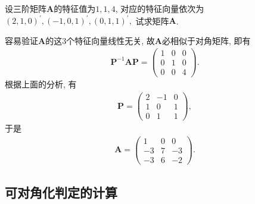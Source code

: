 \documentclass[../../main.tex]{subfiles}%
\begin{document}
\begin{example}
设三阶矩阵\(\boldsymbol{A}\)的特征值为\(1,1,4\), 对应的特征向量依次为
\((2,1,0)^{\prime},(-1,0,1)^{\prime},(0,1,1)^{\prime},\)
试求矩阵\(\boldsymbol{A}\).
\end{example}
\begin{solution}
容易验证\(\boldsymbol{A}\)的这\(3\)个特征向量线性无关, 故\(\boldsymbol{A}\)必相似于对角矩阵, 即有
\begin{align*}
\boldsymbol{P}^{-1}\boldsymbol{AP}=\begin{pmatrix}
1&0&0\\
0&1&0\\
0&0&4
\end{pmatrix}.
\end{align*}
根据上面的分析, 有
\begin{align*}
\boldsymbol{P}=\begin{pmatrix}
2&-1&0\\
1&0&1\\
0&1&1
\end{pmatrix},
\end{align*}
于是
\begin{align*}
\boldsymbol{A}=\begin{pmatrix}
1&0&0\\
-3&7&-3\\
-3&6&-2
\end{pmatrix}. 
\end{align*} 

\end{solution}

\subsection{可对角化判定的计算}
\end{document}
